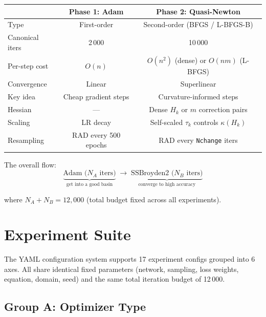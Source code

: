 \documentclass[11pt,a4paper]{article}
\begin{document}
\begin{center}
\renewcommand{\arraystretch}{1.4}
\begin{tabular}{@{}lcc@{}}
\toprule
& \textbf{Phase 1: Adam} & \textbf{Phase 2: Quasi-Newton} \\
\midrule
Type       & First-order           & Second-order (BFGS / L-BFGS-B) \\
Canonical iters & 2\,000           & 10\,000 \\
Per-step cost & $O(n)$             & $O(n^2)$ (dense) or $O(nm)$ (L-BFGS) \\
Convergence & Linear               & Superlinear \\
Key idea   & Cheap gradient steps   & Curvature-informed steps \\
Hessian    & ---                    & Dense $H_k$ or $m$ correction pairs \\
Scaling    & LR decay               & Self-scaled $\tau_k$ controls $\kappa(H_k)$ \\
Resampling & RAD every 500 epochs   & RAD every \texttt{Nchange} iters \\
\bottomrule
\end{tabular}
\end{center}

The overall flow:
\[
  \underbrace{\text{Adam ($N_A$ iters)}}_{\text{get into a good basin}}
  \;\longrightarrow\;
  \underbrace{\text{SSBroyden2 ($N_B$ iters)}}_{\text{converge to high accuracy}}
\]

where $N_A + N_B = 12{,}000$ (total budget fixed across all experiments).


\section{Experiment Suite}
\label{sec:experiments}

The YAML configuration system supports 17 experiment configs grouped
into 6 axes.  All share identical fixed parameters (network, sampling,
loss weights, equation, domain, seed) and the same total iteration
budget of 12\,000.

\subsection{Group A: Optimizer Type}
\end{document}
